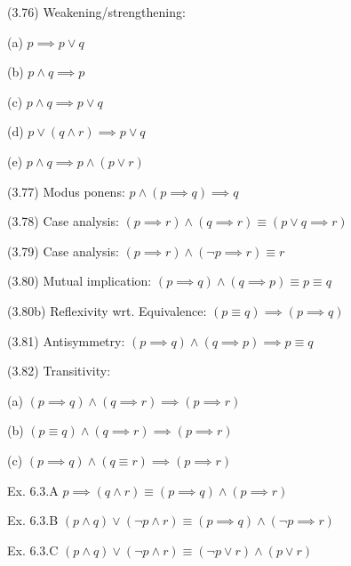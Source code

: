 \documentclass[a4paper,10pt]{article}
\newenvironment{theoremlist}{
\begin{description}
  \setlength{\itemsep}{1.5pt}
  \setlength{\parskip}{0pt}
  \setlength{\parsep}{0pt}
}{\end{description}}
\begin{document}
\begin{theoremlist}
\item[(3.76) Weakening/strengthening:]
  \begin{theoremlist}
  \item %
  \item[(a)]									$ p \implies p \lor q $
  \item[(b)] 									$ p \land q \implies p $
  \item[(c)] 									$ p \land q \implies p \lor q $
  \item[(d)] 									$ p \lor (q \land r) \implies p \lor q $
  \item[(e)] 									$ p \land q \implies p \land (p \lor r) $
  \end{theoremlist} 
\item[(3.77) Modus ponens:]							$ p \land (p \implies q) \implies q $
\item[(3.78) Case analysis:]							$ (p \implies r) \land (q \implies r) \equiv (p \lor q \implies r) $
\item[(3.79) Case analysis:]							$ (p \implies r) \land (\lnot p \implies r) \equiv r $							
\item[(3.80) Mutual implication:]						$ (p \implies q) \land (q \implies p) \equiv p \equiv q $
\item[(3.80b) Reflexivity wrt. Equivalence:]					$ (p \equiv q) \implies (p \implies q) $
\item[(3.81) Antisymmetry:]							$ (p \implies q) \land (q \implies p) \implies p \equiv q $
\item[(3.82) Transitivity:]							
  \begin{theoremlist}
  \item %
  \item[(a)]									$ (p \implies q) \land (q \implies r) \implies (p \implies r) $
  \item[(b)] 									$ (p \equiv q) \land (q \implies r) \implies (p \implies r) $
  \item[(c)] 									$ (p \implies q) \land (q \equiv r) \implies (p \implies r) $
  \end{theoremlist}
\item[Ex. 6.3.A]								$ p \implies (q \land r) \equiv (p \implies q) \land (p \implies r) $
\item[Ex. 6.3.B]								$ (p \land q) \lor (\lnot p \land r) \equiv (p \implies q) \land (\lnot p \implies r) $
\item[Ex. 6.3.C]								$ (p \land q) \lor (\lnot p \land r) \equiv (\lnot p \lor r) \land (p \lor r) $

\end{theoremlist}
\end{document}

